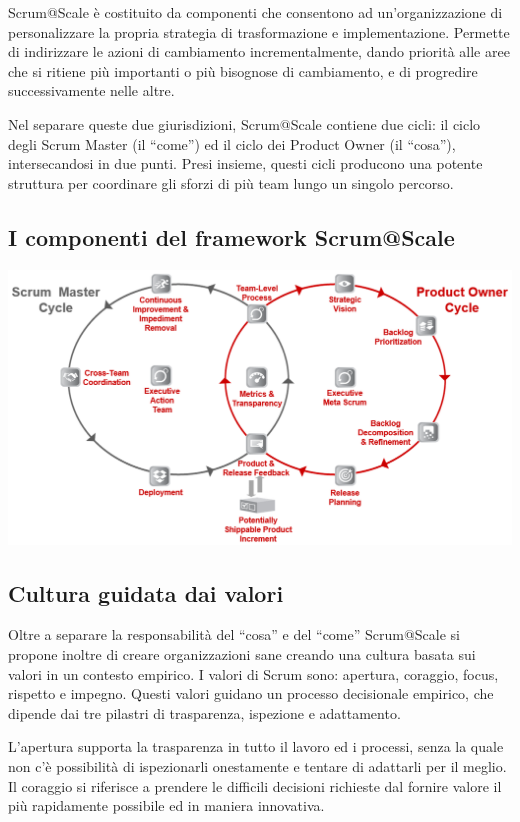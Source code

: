\documentclass[12pt,a4paper,parskip=full]{scrartcl}
\begin{document}
Scrum@Scale è costituito da componenti che consentono ad un'organizzazione di personalizzare la propria strategia di trasformazione e implementazione. Permette di indirizzare le azioni di cambiamento incrementalmente, dando priorità alle aree che si ritiene più importanti o più bisognose di cambiamento, e di progredire successivamente nelle altre.

Nel separare queste due giurisdizioni, Scrum@Scale contiene due cicli: il ciclo degli Scrum Master (il ``come'') ed il ciclo dei Product Owner (il ``cosa''), intersecandosi in due punti. Presi insieme, questi cicli producono una potente struttura per coordinare gli sforzi di più team lungo un singolo percorso.

\subsection{I componenti del framework Scrum@Scale\textregistered}

\includegraphics[width=1.0\linewidth]{SMPO-Cycle.png}

\subsection{Cultura guidata dai valori}

Oltre a separare la responsabilità del ``cosa'' e del ``come'' Scrum@Scale si propone inoltre di creare organizzazioni sane creando una cultura basata sui valori in un contesto empirico. I valori di Scrum sono: apertura, coraggio, focus, rispetto e impegno. Questi valori guidano un processo decisionale empirico, che dipende dai tre pilastri di trasparenza, ispezione e adattamento.

L'apertura supporta la trasparenza in tutto il lavoro ed i processi, senza la quale non c'è possibilità di ispezionarli onestamente e tentare di adattarli per il meglio. Il coraggio si riferisce a prendere le difficili decisioni richieste dal fornire valore il più rapidamente possibile ed in maniera innovativa.
\end{document}
